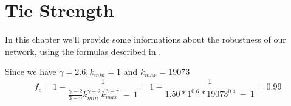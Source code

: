 \chapter{Tie Strength} %
\label{cha:tie_strength}
    In this chapter we'll provide some informations about the robustness of our network, using the formulas described
    in \cite{network_science}.

    Since we have $\gamma = 2.6, k_{\mathit{min}} = 1$ and $k_{\mathit{max}} = 19073$
    \begin{equation*}
        f_c = 1 - \frac{1}
                  {\frac{\gamma - 2}{3 - \gamma}k^{\gamma - 2}_{\mathit{min}}k^{3 - \gamma}_{\mathit{max}} \ - \  1} =
                  1 - \frac{1}{1.50 * 1^{0.6} * 19073^{0.4} \ - \ 1} = 0.99
    \end{equation*}
